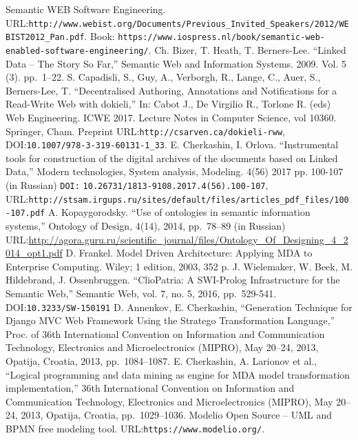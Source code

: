 \documentclass[conference,a4paper]{IEEEtran}
\providecommand\url[1]{\texttt{#1}}
\begin{document}
\begin{thebibliography}{11}
 Semantic WEB Software Engineering. URL:\url{http://www.webist.org/Documents/Previous\_Invited\_Speakers/2012/WEBIST2012\_Pan.pdf}. Book: \url{https://www.iospress.nl/book/semantic-web-enabled-software-engineering/}.
 Ch. Bizer, T. Heath, T. Berners-Lee. ``Linked Data -- The Story So Far,'' Semantic Web and Information Systems. 2009. Vol. 5 (3). pp.~1--22.
 S. Capadisli, S., Guy, A., Verborgh, R., Lange, C., Auer, S., Berners-Lee, T. ``Decentralised Authoring, Annotations and Notifications for a Read-Write Web with dokieli,'' In: Cabot J., De Virgilio R., Torlone R. (eds) Web Engineering. ICWE 2017. Lecture Notes in Computer Science, vol 10360. Springer, Cham. Preprint URL:\url{http://csarven.ca/dokieli-rww}, DOI:\url{10.1007/978-3-319-60131-1_33}.
 E. Cherkashin, I. Orlova. ``Instrumental tools for construction of the digital archives of the documents based on Linked Data,'' Modern technologies, System analysis, Modeling. 4(56) 2017 pp. 100-107 (in Russian) \texttt{DOI:} \url{10.26731/1813-9108.2017.4(56).100-107}, URL:\url{http://stsam.irgups.ru/sites/default/files/articles\_pdf\_files/100-107.pdf}
 A. Kopaygorodsky. ``Use of ontologies in semantic information systems,'' Ontology of Design, 4(14), 2014, pp.~78--89 (in Russian) URL:\href{http://agora.guru.ru/scientific_journal/files/Ontology_Of_Designing_4_2014_opt1.pdf#page=79}{\ttfamily http://agora.guru.ru/scientific\_journal/files/On\-tology\_Of\_Designing\_4\_2014\_opt1.pdf}
 D. Frankel. Model Driven Architecture: Applying MDA to Enterprise Computing. Wiley; 1 edition, 2003, 352 p.
 J. Wielemaker, W. Beek, M. Hildebrand, J. Ossenbruggen. ``ClioPatria: A SWI-Prolog Infrastructure for the Semantic Web,'' Semantic Web, vol. 7, no. 5, 2016, pp.~529-541. DOI:\url{10.3233/SW-150191}
 D. Annenkov, E. Cherkashin, ``Generation Technique for Django MVC Web Framework Using the Stratego Transformation Language,'' Proc. of 36th International Convention on Information and Communication Technology, Electronics and Microelectronics (MIPRO), May 20--24, 2013, Opatija, Croatia, 2013, pp.~1084--1087.
 E. Cherkashin, A. Larionov et al., ``Logical programming and data mining as engine for MDA model transformation implementation,'' 36th International Convention on Information and Communication Technology, Electronics and Microelectronics (MIPRO), May 20--24, 2013, Opatija, Croatia, pp.~1029--1036.
 Modelio Open Source -- UML and BPMN free modeling tool. URL:\url{https://www.modelio.org/}.

\end{thebibliography}
\end{document}
